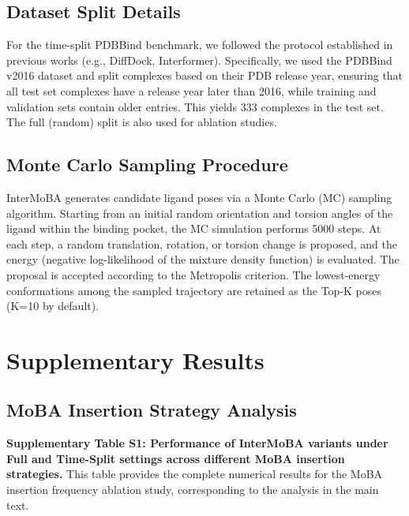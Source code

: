 ﻿\documentclass[11pt,a4paper]{article}
\begin{document}
\subsection{Dataset Split Details}
For the time-split PDBBind benchmark, we followed the protocol established in previous works (e.g., DiffDock, Interformer). Specifically, we used the PDBBind v2016 dataset and split complexes based on their PDB release year, ensuring that all test set complexes have a release year later than 2016, while training and validation sets contain older entries. This yields 333 complexes in the test set. The full (random) split is also used for ablation studies.

\subsection{Monte Carlo Sampling Procedure}
InterMoBA generates candidate ligand poses via a Monte Carlo (MC) sampling algorithm. Starting from an initial random orientation and torsion angles of the ligand within the binding pocket, the MC simulation performs 5000 steps. At each step, a random translation, rotation, or torsion change is proposed, and the energy (negative log-likelihood of the mixture density function) is evaluated. The proposal is accepted according to the Metropolis criterion. The lowest-energy conformations among the sampled trajectory are retained as the Top-K poses (K=10 by default).

\section{Supplementary Results}

\subsection{MoBA Insertion Strategy Analysis}

\textbf{Supplementary Table S1: Performance of InterMoBA variants under Full and Time-Split settings across different MoBA insertion strategies.}
This table provides the complete numerical results for the MoBA insertion frequency ablation study, corresponding to the analysis in the main text.
\end{document}
